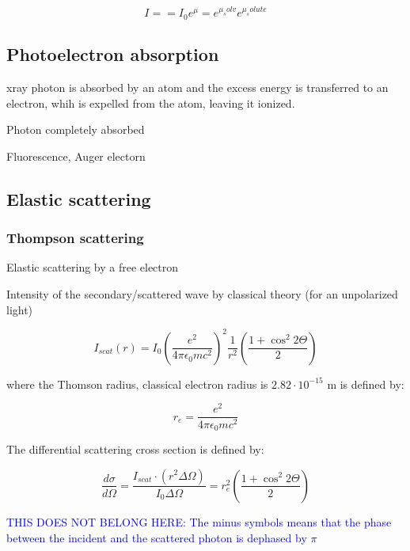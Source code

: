 \begin{equation}
        I = = I_0 e^{\mu}=e^{\mu_solv}e^{\mu_solute}
\end{equation}

\subsection{Photoelectron absorption}

xray photon is absorbed by an atom and the excess energy is transferred to an electron, whih is expelled from the atom, leaving it ionized.

Photon completely absorbed

Fluorescence, Auger electorn

\subsection{Elastic scattering}

\subsubsection{Thompson scattering}
Elastic scattering by a free electron

Intensity of the secondary/scattered wave by classical theory (for an unpolarized light)

\begin{equation}
        I_{scat}\left( r \right)= I_0 \left( \frac{e^2}{4\pi \epsilon_0 m c^2} \right)^2 \frac{1}{r^2} \left( \frac{1+\cos^2{2\Theta}}{2} \right)
\end{equation}

where the Thomson radius, classical electron radius is $2.82\cdot10^{-15}$ m is defined by:

\begin{equation}
        r_e= \frac{e^2}{4\pi\epsilon_0 m c^2}
\end{equation}

The differential scattering cross section is defined by:

\begin{equation}
        \frac{d\sigma}{d\Omega}= \frac{I_{scat} \cdot \left(r^2 \Delta \Omega \right)}{I_0\Delta \Omega}=r_e^2\left( \frac{1+\cos^2{2\Theta}}{2} \right)
\end{equation}


\textcolor{blue}{THIS DOES NOT BELONG HERE: The minus symbols means that the phase between the incident and the scattered photon is dephased by $\pi$}

